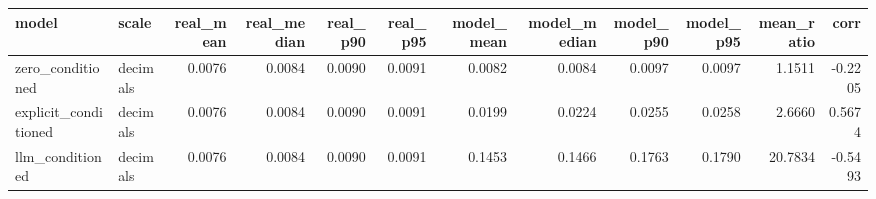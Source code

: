 \begin{tabular}{llrrrrrrrrrr}
\toprule
model & scale & real_mean & real_median & real_p90 & real_p95 & model_mean & model_median & model_p90 & model_p95 & mean_ratio & corr \\
\midrule
zero_conditioned & decimals & 0.0076 & 0.0084 & 0.0090 & 0.0091 & 0.0082 & 0.0084 & 0.0097 & 0.0097 & 1.1511 & -0.2205 \\
explicit_conditioned & decimals & 0.0076 & 0.0084 & 0.0090 & 0.0091 & 0.0199 & 0.0224 & 0.0255 & 0.0258 & 2.6660 & 0.5674 \\
llm_conditioned & decimals & 0.0076 & 0.0084 & 0.0090 & 0.0091 & 0.1453 & 0.1466 & 0.1763 & 0.1790 & 20.7834 & -0.5493 \\
\bottomrule
\end{tabular}

